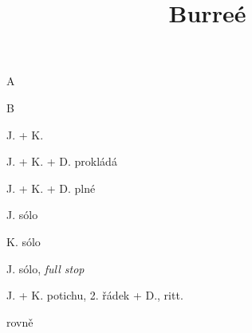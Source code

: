 \documentclass[timestamp]{jazzgrid}
\title{\textbf{Burreé}}
\begin{document}
\maketitle
\begin{musicsection}{A}
\barline
	{\barfour{}
		{}
		{}
		{}
		{}
	}
	{\barfour{}
		{}
		{}
		{}
		{}
	}
	{\barfour{}
		{}
		{}
		{}
		{}
	}
	{\barfour{}
		{}
		{}
		{}
		{}
	}
\barline
	{\barfour{}
		{}
		{}
		{}
		{}
	}
	{\barfour{}
		{}
		{}
		{}
		{}
	}
	{\barfour{}
		{}
		{}
		{}
		{}
	}
	{\barfour{}
		{}
		{}
		{}
		{}
	}
\end{musicsection}

\begin{musicsection}{B}
\barline
	{\barfour{}
		{}
		{}
		{}
		{}
	}
	{\barfour{}
		{}
		{}
		{}
		{}
	}
	{\barfour{}
		{}
		{}
		{}
		{}
	}
	{\barfour{}
		{}
		{}
		{}
		{}
	}
\barline
	{\barfour{}
		{}
		{}
		{}
		{}
	}
	{\barfour{}
		{}
		{}
		{}
		{}
	}
	{\barfour{}
		{}
		{}
		{}
		{}
	}
	{\barfour{}
		{}
		{}
		{}
		{}
	}
\barline
	{\barfour{}
		{}
		{}
		{}
		{}
	}
	{\barfour{}
		{}
		{}
		{}
		{}
	}
	{\barfour{}
		{}
		{}
		{}
		{}
	}
	{\barfour{}
		{}
		{}
		{}
		{}
	}
\barline
	{\barfour{}
		{}
		{}
		{}
		{}
	}
	{\barfour{}
		{}
		{}
		{}
		{}
	}
	{\barfour{}
		{}
		{}
		{}
		{}
	}
	{
		{}
		{}
		{}
		{}
	}
	{
		{}
		{}
		{}
		{}
	}
\end{musicsection}

\begin{multicols*}{2}
\begin{description}[noitemsep,align=right,labelwidth=\widthof{\scriptsize\bfseries{AA}}]
	\scriptsize
	\item [A] J. + K.
	\item [A] J. + K. + D. prokládá
	\item [A] J. + K. + D. plné
	\item [AA] J. sólo
	\item [AA] K. sólo
	\item [AA] J. sólo, \emph{full stop}
	\item [A] J. + K. potichu, 2. řádek + D., ritt.
	\item [BB] rovně
\end{description}
\vfill\null
\columnbreak
\end{multicols*}
\end{document}
